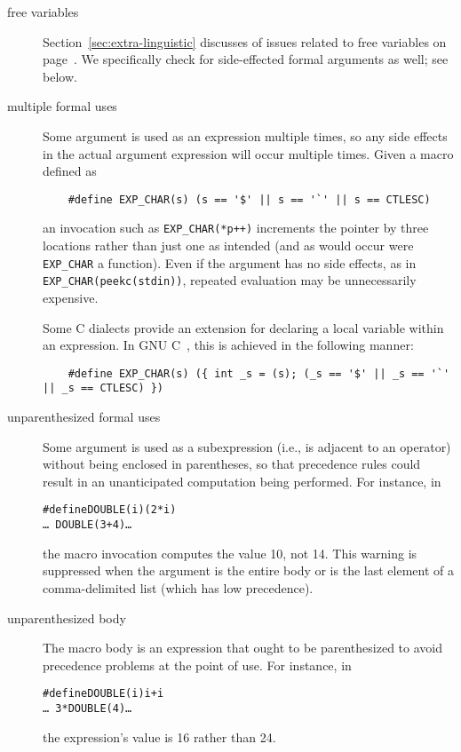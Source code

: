 \documentclass[10pt]{article}
\begin{document}
\begin{description}
\item[free variables]
  Section~\ref{sec:extra-linguistic} discusses of issues related to free
  variables on page~\pageref{page:freevar}.  We specifically check for
  side-effected formal arguments as well; see below.

\item[multiple formal uses]
  Some argument is used as an expression multiple times, so any side
  effects in the actual argument expression will occur multiple times.
  Given a macro defined as
\begin{verbatim}
    #define EXP_CHAR(s) (s == '$' || s == '`' || s == CTLESC)
\end{verbatim}
  an invocation such as {\tt \verb|EXP_CHAR|(*p++)} increments the pointer
  by three locations rather than just one as intended (and as would occur
  were \verb|EXP_CHAR| a function).  Even if the argument has no side
  effects, as in {\tt \verb|EXP_CHAR|(peekc(stdin))}, repeated evaluation may be
  unnecessarily expensive.
        
  Some C dialects provide an extension for declaring a local variable
  within an expression.  In GNU C~\cite{GCC}, this is achieved in the
  following manner:
\begin{verbatim}
    #define EXP_CHAR(s) ({ int _s = (s); (_s == '$' || _s == '`' || _s == CTLESC) })
\end{verbatim}

\item[unparenthesized formal uses]
        Some argument is used as a subexpression (i.e., is adjacent to an
        operator) without being enclosed in parentheses, so that precedence
        rules could result in an unanticipated computation being performed.
        For instance, in
\begin{alltt}
    #define DOUBLE(i) (2*i)
    \ldots\ DOUBLE(3+4) \ldots
\end{alltt}
        the macro invocation computes the value 10, not 14.
        This warning is suppressed when the argument is the entire body
        or is the last element of a comma-delimited list (which has 
        low precedence).

\item[unparenthesized body]
        The macro body is an expression that ought to be parenthesized to
        avoid precedence problems at the point of use.  For instance, in
\begin{alltt}
    #define DOUBLE(i) i+i
    \ldots\ 3*DOUBLE(4) \ldots
\end{alltt}
        the expression's value is 16 rather than 24.
        

\end{description}
\end{document}
